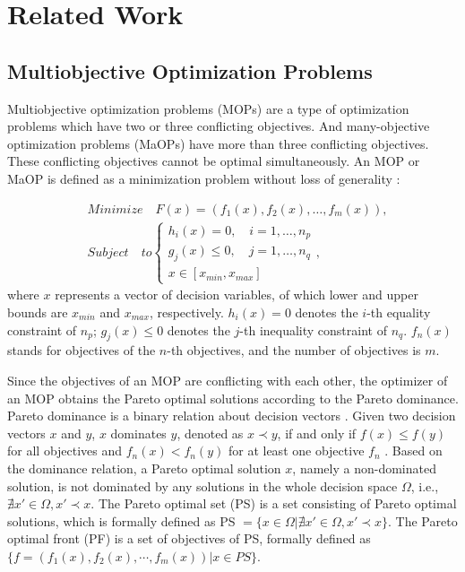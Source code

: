 \documentclass[preprint,12pt]{elsarticle}
\begin{document}
\section{Related Work}\label{sec:related-work}
\subsection{Multiobjective Optimization Problems}

Multiobjective optimization problems (MOPs) are a type of optimization problems which have two or three conflicting objectives.
And many-objective optimization problems (MaOPs) have more than three conflicting objectives.
These conflicting objectives cannot be optimal simultaneously.
An MOP or MaOP is defined as a minimization problem without loss of generality \cite{infeasible}:

\begin{equation}\label{eq:MOP}
	\begin{aligned}
		 & Minimize \quad F(x)=(f_1(x),f_2(x),\dots,f_m(x)), \\
		 & Subject \quad to
		\begin{cases}
			h_i(x)=0,\quad i=1,\dots,n_p     \\
			g_j(x)\leq 0,\quad j=1,\dots,n_q \\
			x \in [x_{min},x_{max}]
		\end{cases}
		,
	\end{aligned}
\end{equation}
where $x$ represents a vector of decision variables, of which lower and upper bounds are $x_{min}$ and $x_{max}$, respectively.
$h_i(x) = 0$ denotes the $i$-th equality constraint of $n_p$; $g_j(x) \leq 0$ denotes the $j$-th inequality constraint of $n_q$.
$f_n(x)$ stands for objectives of the $n$-th objectives, and the number of objectives is $m$.

Since the objectives of an MOP are conflicting with each other, the optimizer of an MOP obtains the Pareto optimal solutions according to the Pareto dominance.
Pareto dominance is a binary relation about decision vectors \cite{zhou2011multiobjective}.
Given two decision vectors $x$ and $y$, $x$ dominates $y$, denoted as $x \prec y$, if and only if $f(x) \leq f(y)$ for all objectives and $f_n(x) < f_n(y)$ for at least one objective $f_n$ \cite{nonlinear}.
Based on the dominance relation, a Pareto optimal solution $x$, namely a non-dominated solution, is not dominated by any solutions in the whole decision space $\Omega$, i.e., $\nexists x' \in \Omega, x' \prec x$.
The Pareto optimal set (PS) is a set consisting of Pareto optimal solutions, which is formally defined as PS $= \{ x \in \Omega \vert \nexists x' \in \Omega, x' \prec x \}$.
The Pareto optimal front (PF) is a set of objectives of PS, formally defined as $\{f = (f_1(x),f_2(x),\cdots,f_m(x))| x \in PS\}$.
\end{document}
